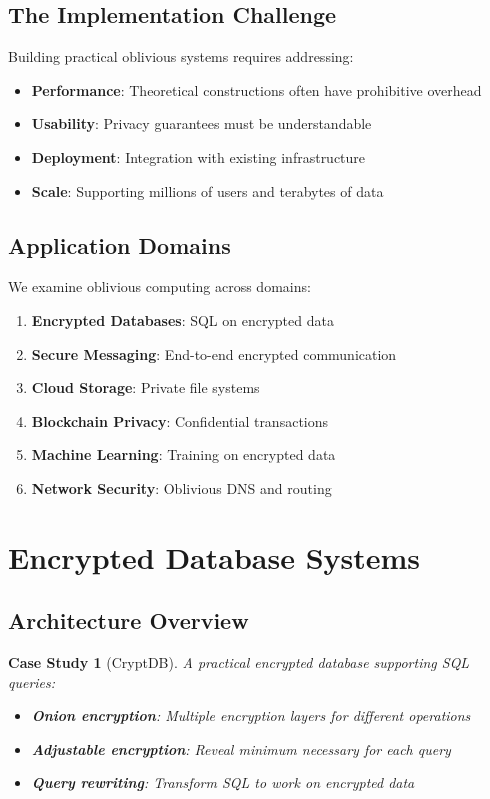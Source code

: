 \documentclass[11pt,final]{article}
\newtheorem{casestudy}[theorem]{Case Study}
\begin{document}
\subsection{The Implementation Challenge}

Building practical oblivious systems requires addressing:
\begin{itemize}
    \item \textbf{Performance}: Theoretical constructions often have prohibitive overhead
    \item \textbf{Usability}: Privacy guarantees must be understandable
    \item \textbf{Deployment}: Integration with existing infrastructure
    \item \textbf{Scale}: Supporting millions of users and terabytes of data
\end{itemize}

\subsection{Application Domains}

We examine oblivious computing across domains:
\begin{enumerate}
    \item \textbf{Encrypted Databases}: SQL on encrypted data
    \item \textbf{Secure Messaging}: End-to-end encrypted communication
    \item \textbf{Cloud Storage}: Private file systems
    \item \textbf{Blockchain Privacy}: Confidential transactions
    \item \textbf{Machine Learning}: Training on encrypted data
    \item \textbf{Network Security}: Oblivious DNS and routing
\end{enumerate}

\section{Encrypted Database Systems}

\subsection{Architecture Overview}

\begin{casestudy}[CryptDB]
A practical encrypted database supporting SQL queries:
\begin{itemize}
    \item \textbf{Onion encryption}: Multiple encryption layers for different operations
    \item \textbf{Adjustable encryption}: Reveal minimum necessary for each query
    \item \textbf{Query rewriting}: Transform SQL to work on encrypted data
\end{itemize}
\end{casestudy}
\end{document}
